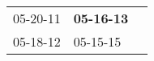 \begin{supertabular}{p{0.33\columnwidth}p{0.33\columnwidth}p{0.33\columnwidth}}
 05-20-11\textsuperscript{} &  \textbf{05-16-13\textsuperscript{}} \\
 05-18-12\textsuperscript{} &           05-15-15\textsuperscript{} \\
\end{supertabular}

